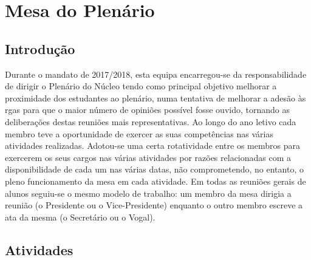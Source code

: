 
\section{Mesa do Plenário}

\subsection{Introdução}

Durante o mandato de 2017/2018, esta equipa encarregou-se da responsabilidade de dirigir o Plenário do Núcleo tendo como principal objetivo melhorar a proximidade dos estudantes ao plenário, numa tentativa de melhorar a adesão às \acrshort{rga}s para que o maior número de opiniões possível fosse ouvido, tornando as deliberações destas reuniões mais representativas. Ao longo do ano letivo cada membro teve a oportunidade de exercer as suas competências nas várias atividades realizadas. Adotou-se uma certa rotatividade entre os membros para exercerem os seus cargos nas várias atividades por razões relacionadas com a disponibilidade de cada um nas várias datas, não comprometendo, no entanto, o pleno funcionamento da mesa em cada atividade. Em todas as reuniões gerais de alunos seguiu-se o mesmo modelo de trabalho: um membro da mesa dirigia a reunião (o Presidente ou o Vice-Presidente) enquanto o outro membro escreve a ata da mesma (o Secretário ou o Vogal).

\subsection{Atividades}















